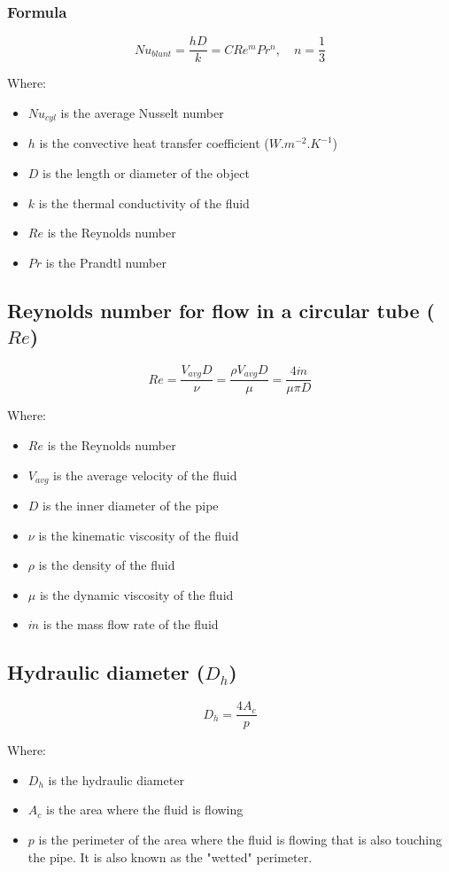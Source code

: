 \documentclass[11pt]{article}
\begin{document}
\subsubsection{Formula}
\label{sec:org46b44cb}
\[Nu_{blunt} = \frac{hD}{k} = C Re^m Pr^n, \quad n = \frac{1}{3}\]

Where:
\begin{itemize}
\item \(Nu_{cyl}\) is the average Nusselt number
\item \(h\) is the convective heat transfer coefficient (\(\unit{W.m^{-2}.K^{-1}}\))
\item \(D\) is the length or diameter of the object
\item \(k\) is the thermal conductivity of the fluid
\item \(Re\) is the Reynolds number
\item \(Pr\) is the Prandtl number
\end{itemize}

\subsection{Reynolds number for flow in a circular tube (\(Re\))}
\label{sec:org9e11eee}
\[Re = \frac{V_{avg} D}{\nu} = \frac{\rho V_{avg} D}{\mu} = \frac{4 \dot{m}}{\mu \pi D}\]

Where:
\begin{itemize}
\item \(Re\) is the Reynolds number
\item \(V_{avg}\) is the average velocity of the fluid
\item \(D\) is the inner diameter of the pipe
\item \(\nu\) is the kinematic viscosity of the fluid
\item \(\rho\) is the density of the fluid
\item \(\mu\) is the dynamic viscosity of the fluid
\item \(\dot{m}\) is the mass flow rate of the fluid
\end{itemize}

\subsection{Hydraulic diameter (\(D_h\))}
\label{sec:org410c543}
\[D_h = \frac{4 A_c}{p}\]

Where:
\begin{itemize}
\item \(D_h\) is the hydraulic diameter
\item \(A_c\) is the area where the fluid is flowing
\item \(p\) is the perimeter of the area where the fluid is flowing that is also touching the pipe. It is also known as the "wetted" perimeter.
\end{itemize}
\end{document}
